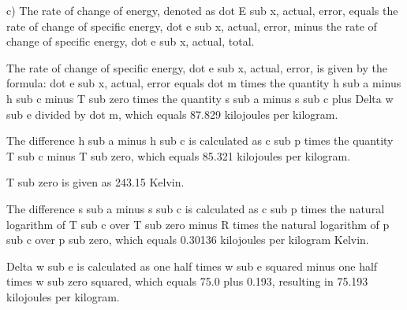 c) The rate of change of energy, denoted as dot E sub x, actual, error, equals the rate of change of specific energy, dot e sub x, actual, error, minus the rate of change of specific energy, dot e sub x, actual, total.

The rate of change of specific energy, dot e sub x, actual, error, is given by the formula:
dot e sub x, actual, error equals dot m times the quantity h sub a minus h sub c minus T sub zero times the quantity s sub a minus s sub c plus Delta w sub e divided by dot m, which equals 87.829 kilojoules per kilogram.

The difference h sub a minus h sub c is calculated as c sub p times the quantity T sub c minus T sub zero, which equals 85.321 kilojoules per kilogram.

T sub zero is given as 243.15 Kelvin.

The difference s sub a minus s sub c is calculated as c sub p times the natural logarithm of T sub c over T sub zero minus R times the natural logarithm of p sub c over p sub zero, which equals 0.30136 kilojoules per kilogram Kelvin.

Delta w sub e is calculated as one half times w sub e squared minus one half times w sub zero squared, which equals 75.0 plus 0.193, resulting in 75.193 kilojoules per kilogram.